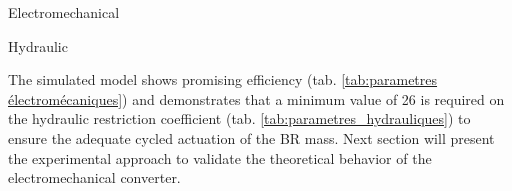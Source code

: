 \documentclass[3p,twocolumn,preprint]{elsarticle}
\def \hfillx {\hspace*{ -\linewidth} \hfill} %
\begin{document}
\begin{table}
\begin{subtable}[b]{.42\linewidth}
	\centering
	\caption{Electromechanical}
	\label{tab:parametres électromécaniques}			
\end{subtable}
\hfillx
\begin{subtable}[b]{.55\linewidth}
	\centering
	\caption{Hydraulic}
	\label{tab:parametres_hydrauliques}		
\end{subtable}
\caption{Simulated model theoretical parameters}
\end{table}

The simulated model shows promising efficiency (tab. \ref{tab:parametres électromécaniques}) and demonstrates that a minimum value of 26 is required on the hydraulic restriction coefficient (tab. \ref{tab:parametres_hydrauliques}) to ensure the adequate cycled actuation of the BR mass. Next section will present the experimental approach to validate the theoretical behavior of the electromechanical converter.
\end{document}
